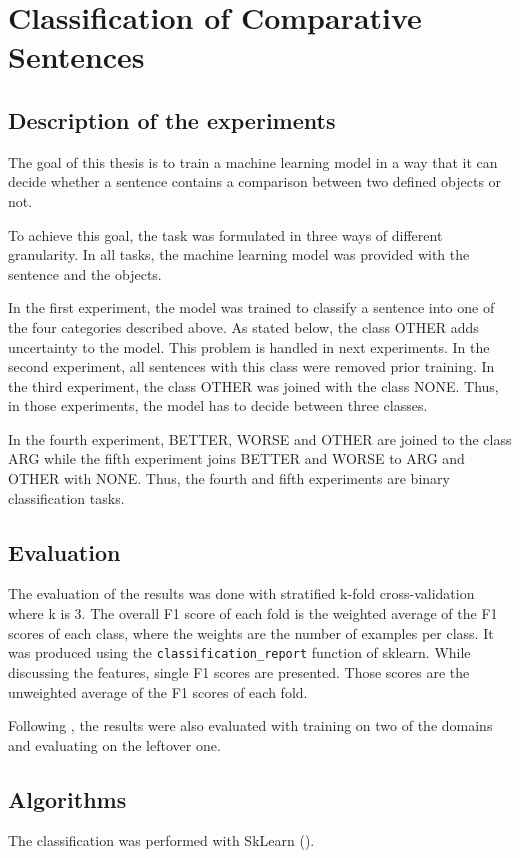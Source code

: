 \chapter{Classification of Comparative Sentences}
\section{Description of the experiments}
The goal of this thesis is to train a machine learning model in a way that it can decide whether a sentence contains a comparison between two defined objects or not.

To achieve this goal, the task was formulated in three ways of different granularity. In all tasks, the machine learning model was provided with the sentence and the objects.

In the first experiment, the model was trained to classify a sentence into one of the four categories described above.
As stated below, the class OTHER adds uncertainty to the model. This problem is handled in next experiments. In the second experiment, all sentences with this class were removed prior training. In the third experiment, the class OTHER was joined with the class NONE.  Thus, in those experiments, the model has to decide between three classes.

In the fourth experiment, BETTER, WORSE and OTHER are joined to the class ARG while the fifth experiment joins BETTER and WORSE to ARG and OTHER with NONE. Thus, the fourth and fifth experiments are binary classification tasks.

\section{Evaluation}
The evaluation of the results was done with stratified k-fold cross-validation where k is 3. The overall F1 score of each fold is the weighted average of the F1 scores of each class, where the weights are the number of examples per class. It was produced using the \texttt{classification\_report} function of sklearn.
While discussing the features, single F1 scores are presented. Those scores are the unweighted average of the F1 scores of each fold.

Following \cite{Daxenberger2017What-is-the-Ess}, the results were also evaluated with training on two of the domains and evaluating on the leftover one.

\section{Algorithms}
The classification was performed with SkLearn (\cite{scikit-learn}).

